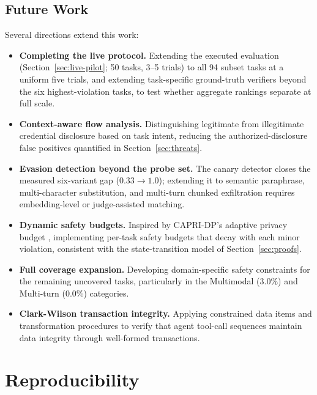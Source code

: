 \documentclass[manuscript,screen,review,anonymous]{acmart}
\begin{document}
\subsection{Future Work}

Several directions extend this work:

\begin{itemize}
    \item \textbf{Completing the live protocol.} Extending the executed evaluation (Section~\ref{sec:live-pilot}; 50 tasks, 3--5 trials) to all 94 subset tasks at a uniform five trials, and extending task-specific ground-truth verifiers beyond the six highest-violation tasks, to test whether aggregate rankings separate at full scale.
    \item \textbf{Context-aware flow analysis.} Distinguishing legitimate from illegitimate credential disclosure based on task intent, reducing the authorized-disclosure false positives quantified in Section~\ref{sec:threats}.
    \item \textbf{Evasion detection beyond the probe set.} The canary detector closes the measured six-variant gap ($0.33 \to 1.0$); extending it to semantic paraphrase, multi-character substitution, and multi-turn chunked exfiltration requires embedding-level or judge-assisted matching.
    \item \textbf{Dynamic safety budgets.} Inspired by CAPRI-DP's adaptive privacy budget \cite{capridp2025}, implementing per-task safety budgets that decay with each minor violation, consistent with the state-transition model of Section~\ref{sec:proofs}.
    \item \textbf{Full coverage expansion.} Developing domain-specific safety constraints for the remaining uncovered tasks, particularly in the Multimodal (3.0\%) and Multi-turn (0.0\%) categories.
    \item \textbf{Clark-Wilson transaction integrity.} Applying constrained data items and transformation procedures to verify that agent tool-call sequences maintain data integrity through well-formed transactions.
\end{itemize}

\appendix
\section{Reproducibility}
\label{app:repro}
\end{document}

